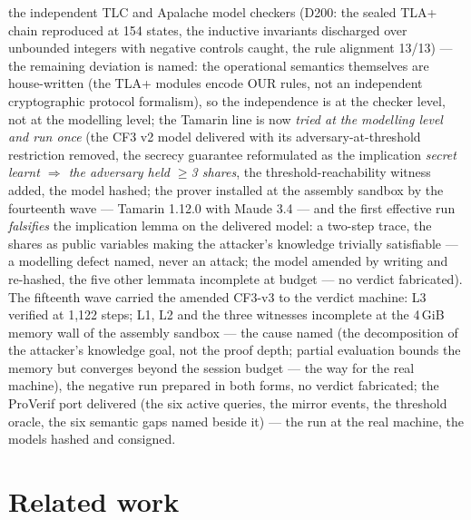 \documentclass[10pt,a4paper]{article}
\begin{document}
the independent TLC and Apalache model checkers (D200: the sealed
TLA+ chain reproduced at 154 states, the inductive invariants
discharged over unbounded integers with negative controls caught,
the rule alignment 13/13) --- the remaining deviation is named: the
operational semantics themselves are house-written (the TLA+
modules encode OUR rules, not an independent cryptographic
protocol formalism), so the independence is at the checker level,
not at the modelling level; the Tamarin line is now \emph{tried at
the modelling level and run once} (the CF3 v2 model delivered with its
adversary-at-threshold restriction removed, the secrecy guarantee
reformulated as the implication \emph{secret learnt $\Rightarrow$
the adversary held $\ge$3 shares}, the threshold-reachability
witness added, the model hashed; the prover installed at the assembly
sandbox by the fourteenth wave --- Tamarin 1.12.0 with Maude 3.4 ---
and the first effective run \emph{falsifies} the implication lemma on
the delivered model: a two-step trace, the shares as public variables
making the attacker's knowledge trivially satisfiable --- a modelling
defect named, never an attack; the model amended by writing and
re-hashed, the five other lemmata incomplete at budget --- no verdict
fabricated). The fifteenth wave carried the amended CF3-v3 to the
verdict machine: L3 verified at 1{,}122 steps; L1, L2 and the three
witnesses incomplete at the 4\,GiB memory wall of the assembly
sandbox --- the cause named (the decomposition of the attacker's
knowledge goal, not the proof depth; partial evaluation bounds the
memory but converges beyond the session budget --- the way for the
real machine), the negative run prepared in both forms, no verdict
fabricated; the ProVerif port delivered (the six active queries, the
mirror events, the threshold oracle, the six semantic gaps named
beside it) --- the run at the real machine, the models hashed and
consigned.

\section{Related work}\label{sec:related}
\end{document}
